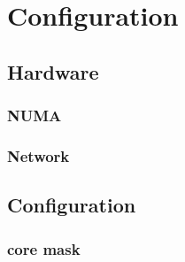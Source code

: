 \chapter{Configuration}

\section{Hardware}

\subsection{NUMA}

\subsection{Network}

\section{Configuration}

\subsection{core mask}
